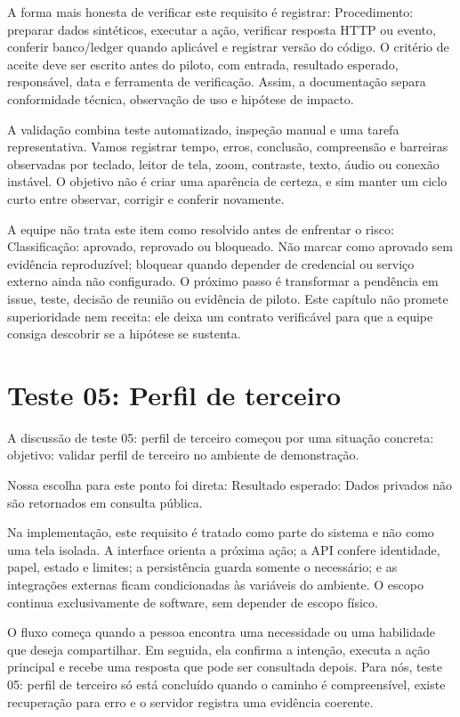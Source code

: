 \documentclass[12pt,oneside,a4paper,article]{abntex2}
\begin{document}
A forma mais honesta de verificar este requisito é registrar: Procedimento: preparar dados sintéticos, executar a ação, verificar resposta HTTP ou evento, conferir banco/ledger quando aplicável e registrar versão do código. O critério de aceite deve ser escrito antes do piloto, com entrada, resultado esperado, responsável, data e ferramenta de verificação. Assim, a documentação separa conformidade técnica, observação de uso e hipótese de impacto.

A validação combina teste automatizado, inspeção manual e uma tarefa representativa. Vamos registrar tempo, erros, conclusão, compreensão e barreiras observadas por teclado, leitor de tela, zoom, contraste, texto, áudio ou conexão instável. O objetivo não é criar uma aparência de certeza, e sim manter um ciclo curto entre observar, corrigir e conferir novamente.

A equipe não trata este item como resolvido antes de enfrentar o risco: Classificação: aprovado, reprovado ou bloqueado. Não marcar como aprovado sem evidência reproduzível; bloquear quando depender de credencial ou serviço externo ainda não configurado. O próximo passo é transformar a pendência em issue, teste, decisão de reunião ou evidência de piloto. Este capítulo não promete superioridade nem receita: ele deixa um contrato verificável para que a equipe consiga descobrir se a hipótese se sustenta.

\section{Teste 05: Perfil de terceiro}
A discussão de teste 05: perfil de terceiro começou por uma situação concreta: objetivo: validar perfil de terceiro no ambiente de demonstração.

Nossa escolha para este ponto foi direta: Resultado esperado: Dados privados não são retornados em consulta pública.

Na implementação, este requisito é tratado como parte do sistema e não como uma tela isolada. A interface orienta a próxima ação; a API confere identidade, papel, estado e limites; a persistência guarda somente o necessário; e as integrações externas ficam condicionadas às variáveis do ambiente. O escopo continua exclusivamente de software, sem depender de escopo físico.

O fluxo começa quando a pessoa encontra uma necessidade ou uma habilidade que deseja compartilhar. Em seguida, ela confirma a intenção, executa a ação principal e recebe uma resposta que pode ser consultada depois. Para nós, teste 05: perfil de terceiro só está concluído quando o caminho é compreensível, existe recuperação para erro e o servidor registra uma evidência coerente.
\end{document}
